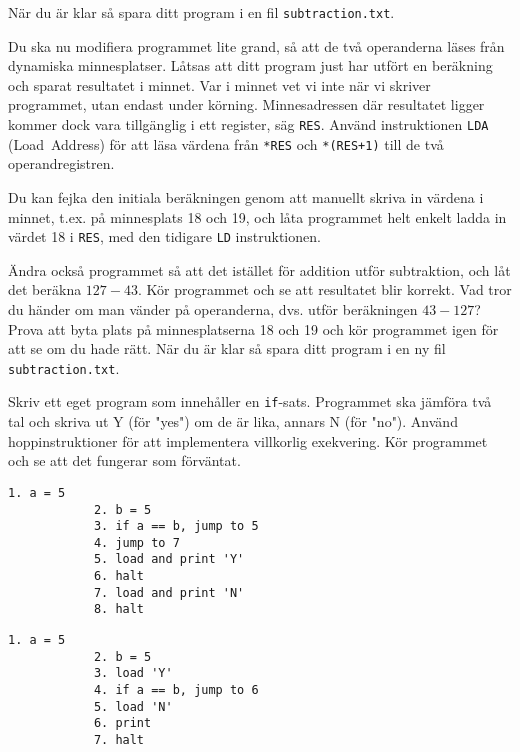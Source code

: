 \begin{Datorarbete}
    När du är klar så spara ditt program i en fil \texttt{subtraction.txt}.


    \item {} Du ska nu modifiera programmet lite grand, så att de två operanderna läses från dynamiska minnesplatser. Låtsas att ditt program just har utfört en beräkning och sparat resultatet i minnet. Var i minnet vet vi inte när vi skriver programmet, utan endast under körning. Minnesadressen där resultatet ligger kommer dock vara tillgänglig i ett register, säg \texttt{RES}. Använd instruktionen \texttt{LDA} (Load~Address) för att läsa värdena från \texttt{*RES} och \texttt{*(RES+1)} till de två operandregistren.
    
    Du kan fejka den initiala beräkningen genom att manuellt skriva in värdena i minnet, t.ex. på minnesplats 18 och 19, och låta programmet helt enkelt ladda in värdet 18 i \texttt{RES}, med den tidigare \texttt{LD} instruktionen.

    Ändra också programmet så att det istället för addition utför subtraktion, och låt det beräkna \(127-43\). Kör programmet och se att resultatet blir korrekt.
    Vad tror du händer om man vänder på operanderna, dvs. utför beräkningen \(43-127\)? Prova att byta plats på minnesplatserna 18 och 19 och kör programmet igen för att se om du hade rätt. När du är klar så spara ditt program i en ny fil \texttt{subtraction.txt}.

    \item {} Skriv ett eget program som innehåller en \texttt{if}-sats. Programmet ska jämföra två tal och skriva ut Y (för "yes") om de är lika, annars N (för "no"). Använd hoppinstruktioner för att implementera villkorlig exekvering. Kör programmet och se att det fungerar som förväntat.

    \begin{minipage}[t]{0.42\textwidth}
        \begin{lstlisting}[xleftmargin=-15mm]
            1. a = 5
            2. b = 5
            3. if a == b, jump to 5
            4. jump to 7
            5. load and print 'Y'
            6. halt
            7. load and print 'N'
            8. halt
        \end{lstlisting}
    \end{minipage}
    \begin{minipage}[t]{0.42\textwidth}
        \begin{lstlisting}[xleftmargin=-15mm]
            1. a = 5
            2. b = 5
            3. load 'Y'
            4. if a == b, jump to 6
            5. load 'N'
            6. print
            7. halt
        \end{lstlisting}
    \end{minipage}


\end{Datorarbete}
